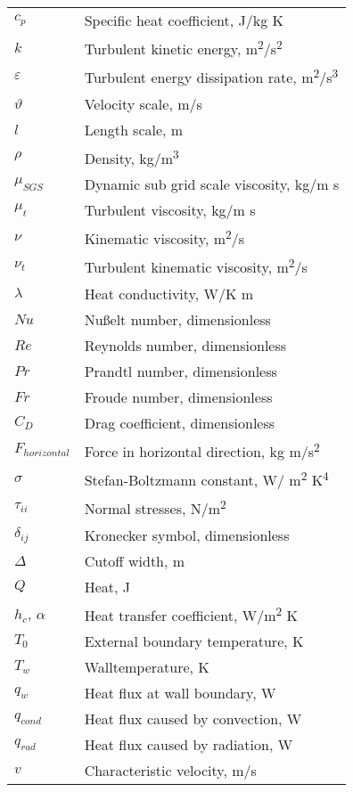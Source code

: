 \begin{table}[h]
\begin{tabular}{ll}
$c_p$&Specific heat coefficient, J/kg K\\
$k$&Turbulent kinetic energy, m\textsuperscript{2}/s\textsuperscript{2}\\
$\varepsilon$&Turbulent energy dissipation rate, m\textsuperscript{2}/s\textsuperscript{3}\\
$\vartheta$&Velocity scale, m/s\\
$l$&Length scale, m\\
$\rho$&Density, kg/m\textsuperscript{3}\\
$\mu_{SGS}$&Dynamic sub grid scale viscosity, kg/m s\\
$\mu_t$&Turbulent viscosity, kg/m s\\
$\nu$&Kinematic viscosity, m\textsuperscript{2}/s\\
$\nu_t$&Turbulent kinematic viscosity, m\textsuperscript{2}/s\\
$\lambda$&Heat conductivity, W/K m\\
$Nu$&Nußelt number, dimensionless\\
$Re$&Reynolds number, dimensionless\\
$Pr$&Prandtl number, dimensionless\\
$Fr$&Froude number, dimensionless\\
$C_D$&Drag coefficient, dimensionless\\
$F_{horizontal}$&Force in horizontal direction, kg m/s\textsuperscript{2}\\
$\sigma$&Stefan-Boltzmann constant, W/ m\textsuperscript{2} K\textsuperscript{4}\\
$\tau_{ii}$&Normal stresses, N/m\textsuperscript{2}\\
$\delta_{ij}$&Kronecker symbol, dimensionless\\
$\Delta$&Cutoff width, m\\
$Q$&Heat, J\\
$h_c$, $\alpha$&Heat transfer coefficient, W/m\textsuperscript{2} K\\
$T_0$&External boundary temperature, K\\
$T_w$&Walltemperature, K\\
$q_w$&Heat flux at wall boundary, W\\
$q_{cond}$&Heat flux caused by convection, W\\
$q_{rad}$&Heat flux caused by radiation, W\\
$v$&Characteristic velocity, m/s\\
\end{tabular}
\end{table}
